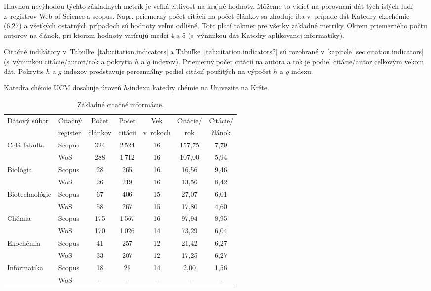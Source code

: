 Hlavnou nevýhodou týchto základných metrík je veľká citlivosť na krajné hodnoty.
Môžeme to vidieť na porovnaní dát tých istých ľudí z~registrov Web of Science a
scopus.  Napr. priemerný počet citácií na počet článkov sa zhoduje iba v~prípade
dát Katedry ekochémie (6,27) a všetkých ostatných prípadoch sú hodnoty veľmi
odlišné.  Toto platí takmer pre všetky základné metriky.  Okrem priemerného
počtu autorov na článok, pri ktorom hodnoty varírujú medzi 4 a 5 (s~výnimkou dát
Katedry aplikovanej informatiky).

Citačné indikátory v~Tabuľke~\ref{tab:citation.indicators} a
Tabuľke~\ref{tab:citation.indicators2} sú rozobrané v~kapitole
\ref{sec:citation.indicators} (s~výnimkou citácie/autori/rok a pokrytia $h$ a
$g$ indexov).  Priemerný počet citácií na autora a rok je podiel citácie/autor
celkovým vekom dát.  Pokrytie $h$ a $g$ indexov predstavuje percenuálny podiel
citácií použitých na výpočet $h$ a $g$ indexu.

Katedra chémie UCM dosahuje úroveň $h$-indexu katedry chémie na Univezite na
Kréte. \citep{LAZARIDIS2010}

\begin{table}
\centering\small
\caption{Základné citačné informácie.}
\label{tab:citation.info}
\begin{tabular}{llccccc}
  \hline\noalign{\vspace{.3ex}}
  Dátový súbor & Citačný  & Počet   & Počet   & Vek      & Citácie/ & Citácie/ \\
               & register & článkov & citácii & v~rokoch & rok      & článok   \\[0.3ex]
  \hline\noalign{\vspace{.5ex}}
  Celá fakulta   & Scopus & 324 & 2\,524 & 16 & 157,75 & 7,79 \\
                 & WoS    & 288 & 1\,712 & 16 & 107,00 & 5,94 \\[1ex]
  Biológia       & Scopus &  28 &    265 & 16 &  16,56 & 9,46 \\
                 & WoS    &  26 &    219 & 16 &  13,56 & 8,42 \\[1ex]
  Biotechnológie & Scopus &  67 &    406 & 15 &  27,07 & 6,01 \\
                 & WoS    &  58 &    267 & 15 &  17,80 & 4,60 \\[1ex]
  Chémia         & Scopus & 175 & 1\,567 & 16 &  97,94 & 8,95 \\
                 & WoS    & 170 & 1\,026 & 14 &  73,29 & 6,04 \\[1ex]
  Ekochémia      & Scopus &  41 &    257 & 12 &  21,42 & 6,27 \\
                 & WoS    &  33 &    207 & 12 &  17,25 & 6,27 \\[1ex]
  Informatika    & Scopus &  18 &     28 & 14 &   2,00 & 1,56 \\
                 & WoS    &  -- &     -- & -- &  --    & --   \\[0.5ex]
  \hline
\end{tabular}
\end{table}


